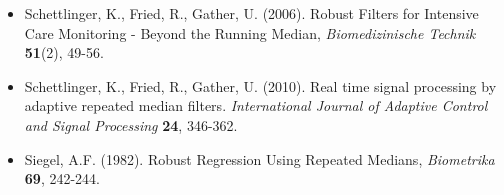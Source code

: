 \documentclass[a4paper]{scrartcl}
\begin{document}
\begin{itemize}
\item
Schettlinger, K., Fried, R., Gather, U. (2006). Robust Filters
for Intensive Care Monitoring - Beyond the Running Median,
\emph{Biomedizinische Technik} \textbf{51}(2), 49-56.

\item
Schettlinger, K., Fried, R., Gather, U. (2010). Real time signal processing by adaptive
repeated median filters. \emph{International Journal of Adaptive Control and Signal Processing} \textbf{24}, 346-362.

\item
Siegel, A.F. (1982). Robust Regression Using Repeated
Medians, \emph{Biometrika} \textbf{69}, 242-244.
\end{itemize}
\end{document}
